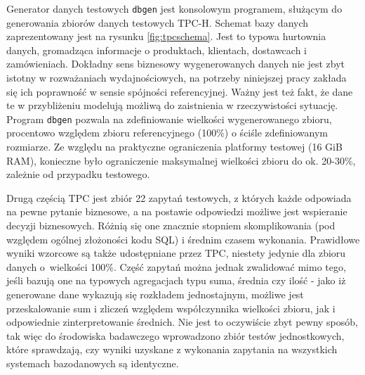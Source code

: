 \documentclass[12pt,twoside,openright]{extarticle}
\begin{document}
    Generator danych testowych \texttt{dbgen} jest konsolowym programem, służącym do generowania zbiorów danych testowych TPC-H. Schemat bazy danych zaprezentowany jest na rysunku \ref{fig:tpcschema}. Jest to typowa hurtownia danych, gromadząca informacje o produktach, klientach, dostawcach i zamówieniach. Dokładny sens biznesowy wygenerowanych danych nie jest zbyt istotny w rozważaniach wydajnościowych, na potrzeby niniejszej pracy zakłada się ich poprawność w sensie spójności referencyjnej. Ważny jest też fakt, że dane te w przybliżeniu modelują możliwą do zaistnienia w rzeczywistości sytuację. Program \texttt{dbgen} pozwala na zdefiniowanie wielkości wygenerowanego zbioru, procentowo względem zbioru referencyjnego (100\%) o ściśle zdefiniowanym rozmiarze. Ze względu na praktyczne ograniczenia platformy testowej (16 GiB RAM), konieczne było ograniczenie maksymalnej wielkości zbioru do ok. 20-30\%, zależnie od przypadku testowego. 

    Drugą częścią TPC jest zbiór 22 zapytań testowych, z których każde odpowiada na pewne pytanie biznesowe, a na postawie odpowiedzi możliwe jest wspieranie decyzji biznesowych. Różnią się one znacznie stopniem skomplikowania (pod względem ogólnej złożoności kodu SQL) i średnim czasem wykonania. Prawidłowe wyniki wzorcowe są także udostępniane przez TPC, niestety jedynie dla zbioru danych o~wielkości 100\%. Część zapytań można jednak zwalidować mimo tego, jeśli bazują one na typowych agregacjach typu suma, średnia czy ilość - jako iż generowane dane wykazują się rozkładem jednostajnym, możliwe jest przeskalowanie sum i zliczeń względem współczynnika wielkości zbioru, jak i odpowiednie zinterpretowanie średnich. Nie jest to oczywiście zbyt pewny sposób, tak więc do środowiska badawczego wprowadzono zbiór testów jednostkowych, które sprawdzają, czy wyniki uzyskane z wykonania zapytania na wszystkich systemach bazodanowych są identyczne.
\end{document}
